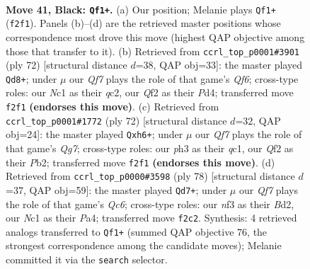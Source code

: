 \documentclass[11pt]{article}
\begin{document}
\clearpage

\begin{figure}[p]\centering
\begin{subfigure}{0.46\textwidth}\centering
\resizebox{\linewidth}{!}{%
\newchessgame
\chessboard[
  setfen={6k1/1p3p2/6p1/p7/7p/5N1P/P4qP1/b1n4K b - - 1 41},
  showmover=false,
  pgfstyle=straightmove, color=movearrow, markmove={f2-f1}
]}
\caption{}
\end{subfigure}\hfill
\begin{subfigure}{0.46\textwidth}\centering
\resizebox{\linewidth}{!}{%
\newchessgame
\chessboard[
  setfen={6k1/p4p2/1p2pQ2/2n5/3P4/7P/P1q2PP1/6K1 w - - 0 37},
  showmover=false,
  pgfstyle=straightmove, color=movearrow, markmove={f6-d8}
]}
\caption{}
\end{subfigure}
\\[4pt]
\begin{subfigure}{0.46\textwidth}\centering
\resizebox{\linewidth}{!}{%
\newchessgame
\chessboard[
  setfen={8/1p4Q1/p2k3p/6p1/6P1/n6P/KP3P2/2q5 w - - 1 37},
  showmover=false,
  pgfstyle=straightmove, color=movearrow, markmove={g7-h6}
]}
\caption{}
\end{subfigure}\hfill
\begin{subfigure}{0.46\textwidth}\centering
\resizebox{\linewidth}{!}{%
\newchessgame
\chessboard[
  setfen={8/k7/p1Qpp3/2pn2p1/P5P1/3P1P2/1q1B3P/7K w - - 0 40},
  showmover=false,
  pgfstyle=straightmove, color=movearrow, markmove={c6-d7}
]}
\caption{}
\end{subfigure}
\caption{\textbf{Move 41, Black: \texttt{Qf1+}.} (a) Our position; Melanie plays \texttt{Qf1+} (\texttt{f2f1}). Panels (b)--(d) are the retrieved master positions whose correspondence most drove this move (highest QAP objective among those that transfer to it). (b) Retrieved from \texttt{ccrl\_top\_p0001\#3901} (ply 72) [structural distance $d$=38, QAP obj=33]: the master played \texttt{Qd8+}; under $\mu$ our \emph{Qf7} plays the role of that game's \emph{Qf6}; cross-type roles: our \emph{N}c1 as their \emph{q}c2, our \emph{Q}f2 as their \emph{P}d4; transferred move \texttt{f2f1} \textbf{(endorses this move)}. (c) Retrieved from \texttt{ccrl\_top\_p0001\#1772} (ply 72) [structural distance $d$=32, QAP obj=24]: the master played \texttt{Qxh6+}; under $\mu$ our \emph{Qf7} plays the role of that game's \emph{Qg7}; cross-type roles: our \emph{p}h3 as their \emph{q}c1, our \emph{Q}f2 as their \emph{P}b2; transferred move \texttt{f2f1} \textbf{(endorses this move)}. (d) Retrieved from \texttt{ccrl\_top\_p0000\#3598} (ply 78) [structural distance $d$=37, QAP obj=59]: the master played \texttt{Qd7+}; under $\mu$ our \emph{Qf7} plays the role of that game's \emph{Qc6}; cross-type roles: our \emph{n}f3 as their \emph{B}d2, our \emph{N}c1 as their \emph{P}a4; transferred move \texttt{f2c2}. Synthesis: 4 retrieved analogs transferred to \texttt{Qf1+} (summed QAP objective 76, the strongest correspondence among the candidate moves); Melanie committed it via the \texttt{search} selector.}
\label{fig:thought-m81}
\end{figure}
\end{document}
